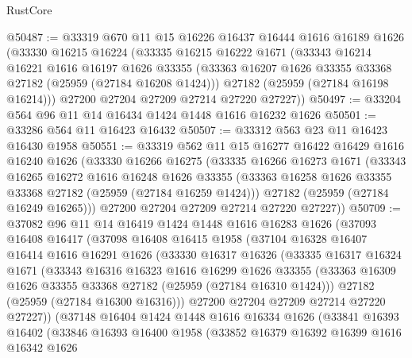 \begin{lexlean}{RustCore}
\begin{coremodule}
@50487 := @33319
    @670
    @11
    @15
    @16226
    @16437
    @16444
    @1616
    @16189
    @1626
    (@33330
      @16215
      @16224
      (@33335
        @16215
        @16222
        @1671
        (@33343
          @16214
          @16221
          @1616
          @16197
          @1626
          @33355
          (@33363 @16207 @1626 @33355 @33368 @27182 (@25959 (@27184 @16208 @1424)))
          @27182
          (@25959 (@27184 @16198 @16214)))
        @27200
        @27204
        @27209
        @27214
        @27220
        @27227))
@50497 := @33204 @564 @96 @11 @14 @16434 @1424 @1448 @1616 @16232 @1626
@50501 := @33286 @564 @11 @16423 @16432
@50507 := @33312 @563 @23 @11 @16423 @16430 @1958
@50551 := @33319
    @562
    @11
    @15
    @16277
    @16422
    @16429
    @1616
    @16240
    @1626
    (@33330
      @16266
      @16275
      (@33335
        @16266
        @16273
        @1671
        (@33343
          @16265
          @16272
          @1616
          @16248
          @1626
          @33355
          (@33363 @16258 @1626 @33355 @33368 @27182 (@25959 (@27184 @16259 @1424)))
          @27182
          (@25959 (@27184 @16249 @16265)))
        @27200
        @27204
        @27209
        @27214
        @27220
        @27227))
@50709 := @37082
    @96
    @11
    @14
    @16419
    @1424
    @1448
    @1616
    @16283
    @1626
    (@37093
      @16408
      @16417
      (@37098
        @16408
        @16415
        @1958
        (@37104
          @16328
          @16407
          @16414
          @1616
          @16291
          @1626
          (@33330
            @16317
            @16326
            (@33335
              @16317
              @16324
              @1671
              (@33343
                @16316
                @16323
                @1616
                @16299
                @1626
                @33355
                (@33363 @16309 @1626 @33355 @33368 @27182 (@25959 (@27184 @16310 @1424)))
                @27182
                (@25959 (@27184 @16300 @16316)))
              @27200
              @27204
              @27209
              @27214
              @27220
              @27227))
          (@37148
            @16404
            @1424
            @1448
            @1616
            @16334
            @1626
            (@33841
              @16393
              @16402
              (@33846
                @16393
                @16400
                @1958
                (@33852
                  @16379
                  @16392
                  @16399
                  @1616
                  @16342
                  @1626

\end{coremodule}
\end{lexlean}
